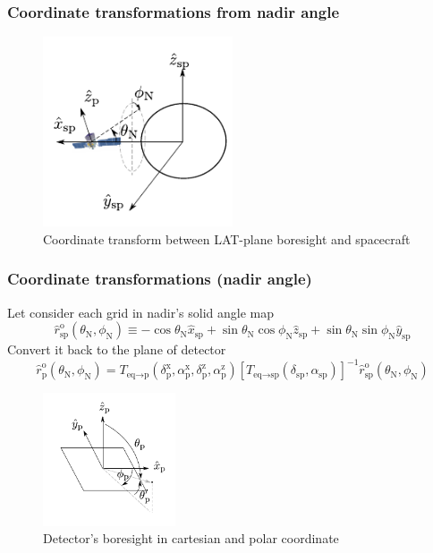 \documentclass{beamer}
\begin{document}
\begin{frame}\frametitle{Coordinate transformations from nadir angle}
  \begin{figure}[h!]
    \centering
    \includegraphics[width=0.5\textwidth]{img/fig_coordinate/coord_eq_p.pdf}
    \caption{Coordinate transform between LAT-plane boresight and spacecraft}
  \end{figure}
\end{frame}
\begin{frame}\frametitle{Coordinate transformations (nadir angle)}
  Let consider each grid in nadir's solid angle map
  \begin{equation}
    \hat{r}^\text{o}_\text{sp} (\theta_\text{N}, \phi_\text{N}) \equiv -\cos\theta_\text{N}\hat{x}_\text{sp} + \sin\theta_\text{N}\cos\phi_\text{N}\hat{z}_\text{sp} + \sin\theta_\text{N}\sin\phi_\text{N}\hat{y}_\text{sp}
    \label{eq:def_r0}
\end{equation}
Convert it back to the plane of detector
\begin{equation}
    \hat{r}^\text{o}_\text{p} (\theta_\text{N}, \phi_\text{N}) = T_{\text{eq}\rightarrow\text{p}} (\delta^\text{x}_\text{p}, \alpha^\text{x}_\text{p}, \delta^\text{z}_\text{p}, \alpha^\text{z}_\text{p}) \left[T_{\text{eq}\rightarrow\text{sp}} (\delta_\text{sp}, \alpha_\text{sp})\right]^{-1} \hat{r}^\text{o}_\text{sp} (\theta_\text{N}, \phi_\text{N})
    \label{eq:def_r0_to_rp}
\end{equation}
\begin{figure}[h!]
  \centering
  \includegraphics[width=0.35\textwidth]{img/fig_coordinate/coord_plane.pdf}
  \caption{Detector's boresight in cartesian and polar coordinate}
  \label{fig:tf_lat_pol_car}
\end{figure}
\end{frame}
\end{document}
